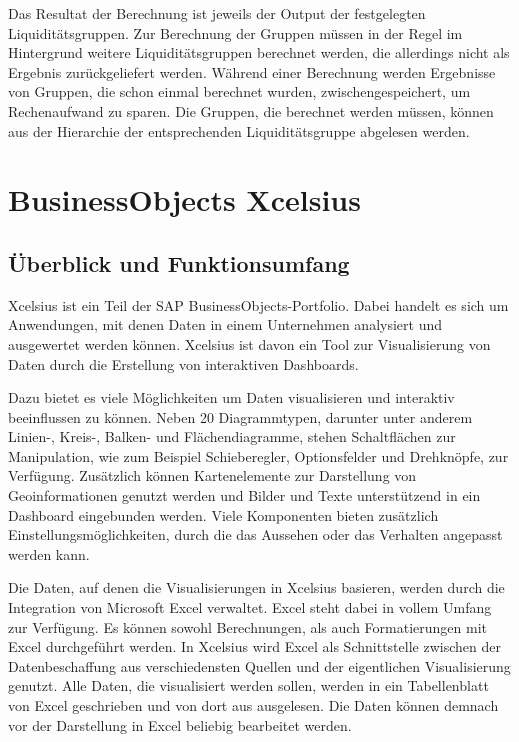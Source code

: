 \begin{onehalfspacing}
Das Resultat der Berechnung ist jeweils der Output der festgelegten Liquiditätsgruppen. Zur Berechnung der Gruppen müssen in der Regel im Hintergrund weitere Liquiditätsgruppen berechnet werden, die allerdings nicht als Ergebnis zurückgeliefert werden. Während einer Berechnung werden Ergebnisse von Gruppen, die schon einmal berechnet wurden, zwischengespeichert, um Rechenaufwand zu sparen. Die Gruppen, die berechnet werden müssen, können aus der Hierarchie der entsprechenden Liquiditätsgruppe abgelesen werden.

\section{BusinessObjects Xcelsius}
\label{sec:xcelsius}
\subsection{Überblick und Funktionsumfang} 
\gls{Xcelsius} ist ein Teil der SAP BusinessObjects-Portfolio. Dabei handelt es sich um Anwendungen, mit denen Daten in einem Unternehmen analysiert und ausgewertet werden können. \gls{Xcelsius} ist davon ein Tool zur Visualisierung von Daten durch die Erstellung von interaktiven Dashboards.

Dazu bietet es viele Möglichkeiten um Daten visualisieren und interaktiv beeinflussen zu können. Neben 20 Diagrammtypen, darunter unter anderem Linien-, Kreis-, Balken-  und Flächendiagramme, stehen Schaltflächen zur Manipulation, wie zum Beispiel Schieberegler, Optionsfelder und Drehknöpfe, zur Verfügung. Zusätzlich können Kartenelemente zur Darstellung von Geoinformationen genutzt werden und Bilder und Texte unterstützend in ein Dashboard eingebunden werden. Viele Komponenten bieten zusätzlich Einstellungsmöglichkeiten, durch die das Aussehen oder das Verhalten angepasst werden kann.

Die Daten, auf denen die Visualisierungen in \gls{Xcelsius} basieren, werden durch die Integration von Microsoft Excel verwaltet. Excel steht dabei in vollem Umfang zur Verfügung. Es können sowohl  Berechnungen, als auch Formatierungen mit Excel durchgeführt werden. In \gls{Xcelsius} wird Excel als Schnittstelle zwischen der Datenbeschaffung aus verschiedensten Quellen und der eigentlichen Visualisierung genutzt. Alle Daten, die visualisiert werden sollen, werden in ein Tabellenblatt von Excel geschrieben und von dort aus ausgelesen. Die Daten können demnach vor der Darstellung in Excel beliebig bearbeitet werden. 


\end{onehalfspacing}
